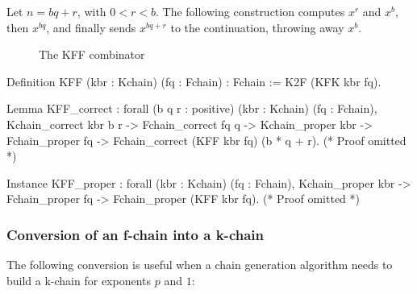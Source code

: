 Let $n=bq+r$, with $0<r<b$. The following construction computes
$x^r$ and $x^b$, then $x^{bq}$, and finally sends $x^{bq+r}$ to the continuation,
throwing away $x^b$.


\begin{figure}[h]
  \centering
  \caption{The KFF combinator}
  \label{fig:KFF}
\end{figure}



\begin{Coqsrc}
Definition KFF (kbr : Kchain) (fq : Fchain) : Fchain :=
  K2F (KFK kbr fq).

Lemma KFF_correct :
forall (b q r : positive) (kbr : Kchain) (fq : Fchain),
Kchain_correct kbr b r ->
Fchain_correct fq q ->
Kchain_proper kbr ->
Fchain_proper fq -> Fchain_correct (KFF kbr fq) (b * q + r).
(* Proof omitted *)


Instance KFF_proper :
forall (kbr : Kchain) (fq : Fchain),
Kchain_proper kbr -> Fchain_proper fq -> Fchain_proper (KFF kbr fq).
(* Proof omitted *)
\end{Coqsrc}


\subsubsection{Conversion of an f-chain into a k-chain}
The following conversion is useful when a chain generation algorithm
needs to build a k-chain for exponents $p$ and $1$:

